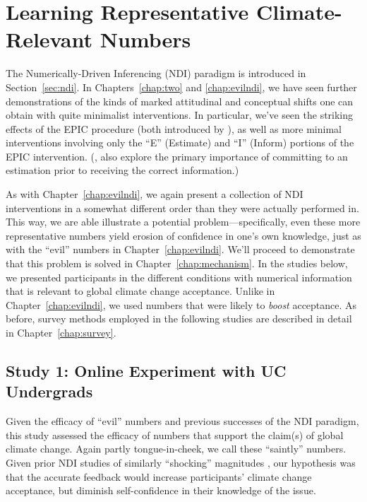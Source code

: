 \graphicspath{{pro-ndi/}}

\chapter{Learning Representative Climate-Relevant Numbers}
\label{chap:prondi}

The Numerically-Driven Inferencing (NDI) paradigm is introduced in Section~\ref{sec:ndi}.
In Chapters~\ref{chap:two} and \ref{chap:evilndi}, we have seen further
demonstrations of the kinds of marked attitudinal and conceptual shifts one can
obtain with quite minimalist interventions. In particular, we've seen the
striking effects of the EPIC procedure (both introduced by
\cite{ranney_numerically_2001_fixed}), as well as more minimal
interventions involving only the “E” (Estimate) and “I” (Inform) portions of the
EPIC intervention. (\cite{rinne_estimation_2006}, also explore the primary
importance of committing to an estimation prior to receiving the correct
information.)

As with Chapter~\ref{chap:evilndi}, we again present a collection of NDI
interventions in a somewhat different order than they were actually performed
in. This way, we are able illustrate a potential problem---specifically, even
these more representative numbers yield erosion
of confidence in one's own knowledge, just as with the “evil” numbers in
Chapter~\ref{chap:evilndi}. We'll proceed to demonstrate that this problem is solved in
Chapter~\ref{chap:mechanism}.  In the studies below, we presented participants
in the different conditions with numerical information that is relevant to
global climate change acceptance.  Unlike in Chapter~\ref{chap:evilndi}, we used
numbers that were likely to \emph{boost} acceptance. As before, survey methods employed
in the following studies are described in detail in Chapter~\ref{chap:survey}.

\section{Study 1: Online Experiment with UC Undergrads}
\label{sec:pro-uc}

Given the efficacy of “evil” numbers and previous successes of the NDI paradigm,
this study assessed the efficacy of numbers that support the claim(s) of global
climate change. Again partly tongue-in-cheek, we call these “saintly” numbers.
Given prior NDI studies of similarly “shocking” magnitudes
\parencite[e.g.,][]{garcia_de_osuna_qualitative_2004}, our hypothesis was that
the accurate feedback would increase participants’ climate change acceptance,
but diminish self-confidence in their knowledge of the issue.


